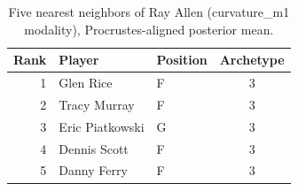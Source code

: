 \begin{table}[htbp]
  \centering\small
  \begin{tabular}{rllc}
    \toprule
    Rank & Player & Position & Archetype \\
    \midrule
    1 & Glen Rice & F & 3 \\
    2 & Tracy Murray & F & 3 \\
    3 & Eric Piatkowski & G & 3 \\
    4 & Dennis Scott & F & 3 \\
    5 & Danny Ferry & F & 3 \\
    \bottomrule
  \end{tabular}
  \caption{Five nearest neighbors of Ray Allen (curvature_m1 modality), Procrustes-aligned posterior mean.}
  \label{tab:Ray_Allen_neighbors_curvature_m1}
\end{table}

